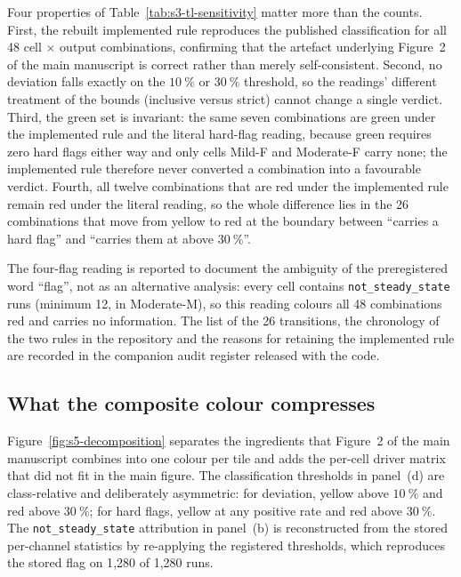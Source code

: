 \documentclass[pdflatex,sn-nature]{sn-jnl}%
\begin{document}
Four properties of Table~\ref{tab:s3-tl-sensitivity} matter more than the counts. First, the rebuilt implemented rule reproduces the published classification for all 48 cell $\times$ output combinations, confirming that the artefact underlying Figure~2 of the main manuscript is correct rather than merely self-consistent. Second, no deviation falls exactly on the $10~\%$ or $30~\%$ threshold, so the readings' different treatment of the bounds (inclusive versus strict) cannot change a single verdict. Third, the green set is invariant: the same seven combinations are green under the implemented rule and the literal hard-flag reading, because green requires zero hard flags either way and only cells Mild-F and Moderate-F carry none; the implemented rule therefore never converted a combination into a favourable verdict. Fourth, all twelve combinations that are red under the implemented rule remain red under the literal reading, so the whole difference lies in the 26 combinations that move from yellow to red at the boundary between ``carries a hard flag'' and ``carries them at above $30~\%$''.

The four-flag reading is reported to document the ambiguity of the preregistered word ``flag'', not as an alternative analysis: every cell contains \texttt{not\_steady\_state} runs (minimum 12, in Moderate-M), so this reading colours all 48 combinations red and carries no information. The list of the 26 transitions, the chronology of the two rules in the repository and the reasons for retaining the implemented rule are recorded in the companion audit register released with the code.


\subsection{What the composite colour compresses}\label{sec:s3-decomposition}

Figure~\ref{fig:s5-decomposition} separates the ingredients that
Figure~2 of the main manuscript combines into one colour per tile and adds the
per-cell driver matrix that did not fit in the main figure.
The classification thresholds in panel~(d) are class-relative and deliberately
asymmetric: for deviation, yellow above $10~\%$ and red above $30~\%$; for hard
flags, yellow at any positive rate and red above $30~\%$. The
\texttt{not\_steady\_state} attribution in panel~(b) is reconstructed
from the stored per-channel statistics by re-applying the
registered thresholds, which reproduces the stored
flag on 1{,}280 of 1{,}280 runs.
\end{document}
